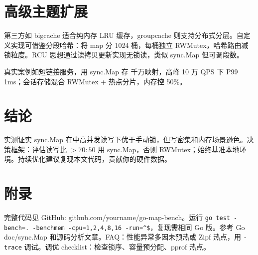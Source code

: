 \chapter{高级主题扩展}
第三方如 bigcache 适合纯内存 LRU 缓存，groupcache 则支持分布式分层。自定义实现可借鉴分段哈希：将 map 分 1024 桶，每桶独立 RWMutex，哈希路由减锁粒度。RCU 思想通过读拷贝更新实现无锁读，类似 sync.Map 但可调段数。\par
真实案例如短链接服务，用 sync.Map 存 千万映射，高峰 10 万 QPS 下 P99 1ms；会话存储混合 RWMutex + 热点分片，内存控 50\%{}。\par
\chapter{结论}
实测证实 sync.Map 在中高并发读写下优于手动锁，但写密集和内存场景逊色。决策框架：评估读写比 $>70:50$ 用 sync.Map，否则 RWMutex；始终基准本地环境。持续优化建议复现本文代码，贡献你的硬件数据。\par
\chapter{附录}
完整代码见 GitHub: github.com/yourname/go-map-bench。运行 \texttt{go test -bench=. -benchmem -cpu=1,2,4,8,16 -run=\^{}\${}}，复现需相同 Go 版。参考 Go doc/sync.Map 和源码分析文章。FAQ：性能异常多因未预热或 Zipf 热点，用 \texttt{-trace} 调试。调优 checklist：检查锁序、容量预分配、pprof 热点。\par
